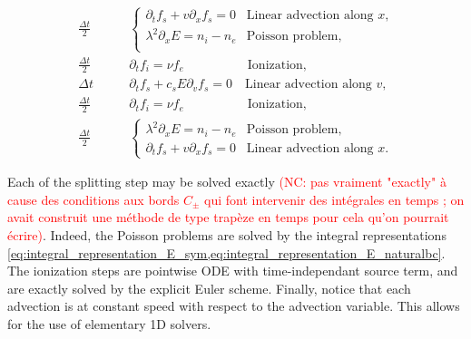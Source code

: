 \documentclass{article}
\numberwithin{equation}{section}
\newcommand{\todo}[1]{{\color{red}\textbf{#1}}}
\begin{document}
\begin{align*}
	\frac{\Delta t}{2} \quad\quad&
	\begin{cases}
		\partial_t f_s + v \partial_x f_s = 0 & \text{Linear advection along $x$,} \\
		\lambda^2 \partial_x E = n_i - n_e & \text{Poisson problem,} \\
	\end{cases} \\
	\frac{\Delta t}{2} \quad\quad&
	\partial_t f_i = \nu f_e \quad\quad\quad\quad\quad \text{Ionization,} \\
	\Delta t \quad\quad&
	\partial_t f_s + c_s E \partial_v f_s = 0 \quad \text{Linear advection along $v$,} \\
	\frac{\Delta t}{2} \quad\quad&
	\partial_t f_i = \nu f_e \quad\quad\quad\quad\quad \text{Ionization,} \\
	\frac{\Delta t}{2} \quad\quad&
	\begin{cases}
		\lambda^2 \partial_x E = n_i - n_e & \text{Poisson problem,}\\
		\partial_t f_s + v \partial_x f_s = 0 & \text{Linear advection along $x$.}
	\end{cases} 
\end{align*}

Each of the splitting step may be solved exactly \textcolor{red}{(NC: pas vraiment "exactly" \`a cause des conditions aux bords 
$C_\pm$ qui font intervenir des int\'egrales en temps ; on avait construit une m\'ethode de type trap\`eze en temps pour cela 
qu'on pourrait \'ecrire)}. Indeed, the Poisson problems are solved by the integral representations \cref{eq:integral_representation_E_sym,eq:integral_representation_E_naturalbc}. The ionization steps are pointwise ODE with time-independant source term, and are exactly solved by the explicit Euler scheme. Finally, notice that each advection is at constant speed with respect to the advection variable. This allows for the use of elementary 1D solvers.  

\end{document}
